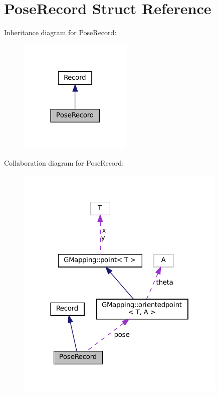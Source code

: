 \hypertarget{structPoseRecord}{}\section{Pose\+Record Struct Reference}
\label{structPoseRecord}


Inheritance diagram for Pose\+Record\+:
\nopagebreak
\begin{figure}[H]
\begin{center}
\leavevmode
\includegraphics[width=153pt]{structPoseRecord__inherit__graph}
\end{center}
\end{figure}


Collaboration diagram for Pose\+Record\+:
\nopagebreak
\begin{figure}[H]
\begin{center}
\leavevmode
\includegraphics[width=286pt]{structPoseRecord__coll__graph}
\end{center}
\end{figure}

